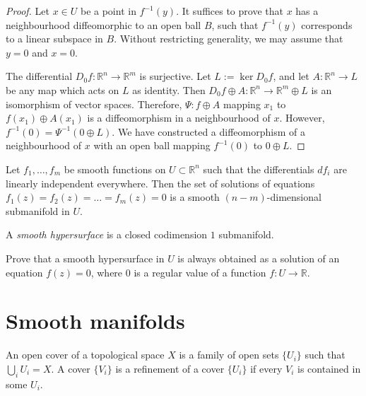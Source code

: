 \begin{proof}
Let $x \in U$ be a point in $f^{-1}(y)$.
It suffices to prove that $x$ has a
neighbourhood diffeomorphic to an open ball
$B$, such that $f^{-1}(y)$ corresponds to a
linear subspace in $B$. Without restricting
generality, we may assume that $y=0$ and
$x=0$.

The differential $D_0f:\mathbb{R}^n \to
\mathbb{R}^m$ is surjective. Let
$L:=\ker D_0f$, and let
$A:\mathbb{R}^n \to L$ be any map which acts
on $L$ as identity. Then
$D_0f \oplus A:\mathbb{R}^n \to
\mathbb{R}^m \oplus L$ is an isomorphism of
vector spaces. Therefore, $\Psi: f \oplus A$
mapping $x_1$ to $f(x_1) \oplus A(x_1)$ is a
diffeomorphism in a neighbourhood of $x$.
However, $f^{-1}(0)=\Psi^{-1}(0 \oplus L)$.
We have constructed a diffeomorphism of a
neighbourhood of $x$ with an open ball
mapping $f^{-1}(0)$ to $0 \oplus L$.
\end{proof}

\begin{corollary}
\label{lemma-regular-maps-solutions}
Let $f_1, \dots, f_m$ be smooth functions on
$U \subset \mathbb{R}^n$ such that the
differentials $df_i$ are linearly
independent everywhere. Then the set of
solutions of equations
$f_1(z)=f_2(z)=\dots=f_m(z)=0$ is a smooth
$(n-m)$-dimensional submanifold in $U$.
\end{corollary}

\begin{definition}
\label{definition-smooth-hypersurface}
A {\it smooth hypersurface} is a closed
codimension $1$ submanifold.
\end{definition}

\begin{exercise}
\label{exercise-smooth-hypersurface-regular-value}
Prove that a smooth hypersurface in $U$ is
always obtained as a solution of an equation
$f(z)=0$, where $0$ is a regular value of a
function $f:U \to \mathbb{R}$.
\end{exercise}

\section{Smooth manifolds}
\label{section-smooth-manifolds}

\begin{definition}
\label{definition-cover-refinement}
An open cover of a topological space $X$ is a
family of open sets $\{U_i\}$ such that
$\bigcup_i U_i=X$. A cover $\{V_i\}$ is a
refinement of a cover $\{U_i\}$ if every
$V_i$ is contained in some $U_i$.
\end{definition}

